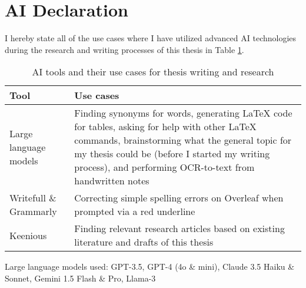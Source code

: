 


\chapter*{AI Declaration\label{extra:declaration}}
\begin{comment}
\end{comment}


I hereby state all of the use cases where I have utilized advanced AI technologies during the research and writing processes of this thesis in Table \ref{table:declaration}.


\begin{table}[h!]  
\renewcommand{\arraystretch}{1.5} %
\setlength{\tabcolsep}{5pt} %
\begin{tabularx}{\textwidth}{|l|X|} %
\hline  
\textbf{Tool} & \textbf{Use cases} \\ \hline  
Large language models & Finding synonyms for words, generating LaTeX code for tables, asking for help with other LaTeX commands, brainstorming what the general topic for my thesis could be (before I started my writing process), and performing OCR-to-text from handwritten notes\\ \hline  
Writefull \& Grammarly & Correcting simple spelling errors on Overleaf when prompted via a red underline\\ \hline  
Keenious & Finding relevant research articles based on existing literature and drafts of this thesis\\ \hline  
\end{tabularx}  
\caption{AI tools and their use cases for thesis writing and research}  
\label{table:declaration}  
\end{table}  

Large language models used: GPT-3.5, GPT-4 (4o \& mini), Claude 3.5 Haiku \& Sonnet, Gemini 1.5 Flash \& Pro, Llama-3
